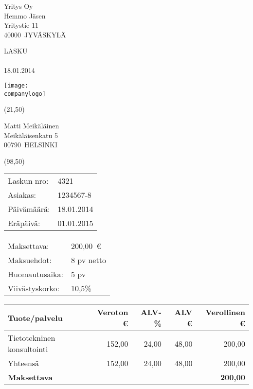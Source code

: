 \documentclass[a4paper]{article}
\newcommand{\theinvoice}{Lasku}
\newcommand{\thecomplaints}{Huomautusaika}
\newcommand{\theterms}{Maksuehdot}
\newcommand{\theinterest}{Viivästyskorko}
\newcommand{\thepayerid}{Asiakas}
\newcommand{\theservice}{Tuote/palvelu}
\newcommand{\theexcleur}{Veroton \euro}
\newcommand{\thevatpercent}{ALV-\%}
\newcommand{\thevateur}{ALV \euro}
\newcommand{\theincleur}{Verollinen \euro}
\newcommand{\thetotal}{Yhteensä}
\newcommand{\thepayable}{Maksettava}
\newcommand{\thedate}{Päivämäärä}
\newcommand{\theduedateup}{Eräpäivä} %
\newcommand{\thepaymentsum}{Maksettava}
\newcommand{\theinvoicenumberup}{Laskun nro} %
\newcommand{\theinvoice}{Invoice}
\newcommand{\thecomplaints}{Period for complaints}
\newcommand{\theterms}{Terms of payment}
\newcommand{\theinterest}{Interest on arrears}
\newcommand{\thepayerid}{Customer}
\newcommand{\theservice}{Product/service}
\newcommand{\theexcleur}{Price \euro}
\newcommand{\thevatpercent}{VAT \%}
\newcommand{\thevateur}{VAT \euro}
\newcommand{\theincleur}{Total price \euro}
\newcommand{\thetotal}{Total}
\newcommand{\thepayable}{Invoice total}
\newcommand{\thedate}{Invoice date}
\newcommand{\theduedateup}{Due date} %
\newcommand{\thepaymentsum}{Invoice total}
\newcommand{\theinvoicenumberup}{Invoice No.} %
\newcommand{\companyname}{Yritys Oy}
\newcommand{\companylogo}{pics/logo.pdf}
\newcommand{\companyperson}{Hemmo Jäsen}
\newcommand{\companyaddress}{Yritystie 11}
\newcommand{\companyzip}{40000}
\newcommand{\companycity}{Jyväskylä}
\newcommand{\payername}{Matti Meikäläinen}
\newcommand{\payeraddress}{Meikäläisenkatu 5}
\newcommand{\payerzip}{00790}
\newcommand{\payercity}{Helsinki}
\newcommand{\payerid}{1234567-8}
\newcommand{\invoicedate}{18.01.2014}
\newcommand{\duedate}{01.01.2015}
\newcommand{\invoicenumber}{4321}
\newcommand{\complaints}{5 pv}
\newcommand{\terms}{8 pv netto}
\newcommand{\interest}{10,5\%}
\newcommand{\paymentsum}{200,00}
\begin{document}
\begin{center}\begin{minipage}[t][175mm][t]{168mm}

\fontsize{12pt}{13pt}\selectfont

\parbox[b][30mm][t]{50mm}{\raggedright \companyname\\ \companyperson\\ \companyaddress\\ \companyzip\ \MakeUppercase{\companycity}}
\hspace{28mm}\parbox[b][30mm][t]{50mm}{\raggedright \MakeUppercase{\theinvoice}\\ \mbox{} \\ \invoicedate}
\hfill\parbox[b][30mm][t]{14.5mm}{\texttt{[image: \\companylogo]}}

\begin{textblock}{90}(21,50)
\parbox[t][50mm][t]{90mm}{\raggedright
\payername\\
\payeraddress\\
\payerzip\ \MakeUppercase{\payercity}
}
\end{textblock}

\fontsize{9pt}{12pt}\selectfont
\begin{textblock}{90}(98,50)
\parbox[t][50mm][t]{40mm}{
\begin{tabular}{l l}
\theinvoicenumberup: & \invoicenumber\\
\thepayerid: & \payerid\\
\thedate: & \invoicedate\\
\theduedateup: & \duedate
\end{tabular}
}
\hfill
\parbox[t][50mm][t]{40mm}{
\begin{tabular}{l l}
\thepaymentsum: & \paymentsum\ \euro\\
\theterms: & \terms\\
\thecomplaints: & \complaints\\
\theinterest: & \interest
\end{tabular}
}
\end{textblock}


\vspace{35mm}

\fontsize{12pt}{13pt}\selectfont
\renewcommand{\arraystretch}{2.0}

\begin{center}
\begin{tabular}{l r r r r}
\theservice \hspace{58mm} & \theexcleur & \thevatpercent & \thevateur & \theincleur \\
\hline
Tietotekninen konsultointi & 152,00 & 24,00 & 48,00 & 200,00 \\
\hline
\thetotal & 152,00 & 24,00 & 48,00 & 200,00 \\
\textbf{\thepayable} & & & & \textbf{200,00}
\end{tabular}
\end{center}


\end{minipage}
\end{center}
\end{document}
